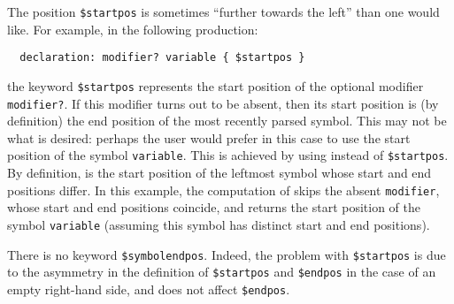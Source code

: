 \documentclass[onecolumn,11pt,nocopyrightspace,preprint]{sigplanconf}
\begin{document}
The position \verb+$startpos+ is sometimes ``further towards the left'' than
one would like. For example, in the following production:
\begin{verbatim}
  declaration: modifier? variable { $startpos }
\end{verbatim}
the keyword \verb+$startpos+ represents the start position of the optional
modifier \verb+modifier?+. If this modifier turns out to be absent, then its
start position is (by definition) the end position of the most recently parsed
symbol. This may not be what is desired: perhaps the user would prefer in this
case to use the start position of the symbol \verb+variable+. This is achieved by
using \ksymbolstartpos instead of \verb+$startpos+. By definition,
\ksymbolstartpos is the start position of the leftmost symbol whose
start and end positions differ. In this example, the computation of
\ksymbolstartpos skips the absent \verb+modifier+, whose start and end
positions coincide, and returns the start position of the symbol \verb+variable+
(assuming this symbol has distinct start and end positions).


There is no keyword \verb+$symbolendpos+. Indeed, the problem
with \verb+$startpos+ is due to the asymmetry in the definition
of \verb+$startpos+ and \verb+$endpos+ in the case of an empty right-hand
side, and does not affect \verb+$endpos+.

\newcommand{\fineprint}{\footnote{%
    The computation of \ksymbolstartpos
    is optimized by \menhir under two assumptions about the lexer. First,
    \menhir assumes that the lexer never produces a token whose start and end
    positions are equal. Second, \menhir assumes that two positions produced
    by the lexer are equal if and only if they are physically equal. If the
    lexer violates either of these assumptions, the computation of
    \ksymbolstartpos could produce a result that differs from
    \texttt{Parsing.symbol\_start\_pos()}.
}}
\end{document}
